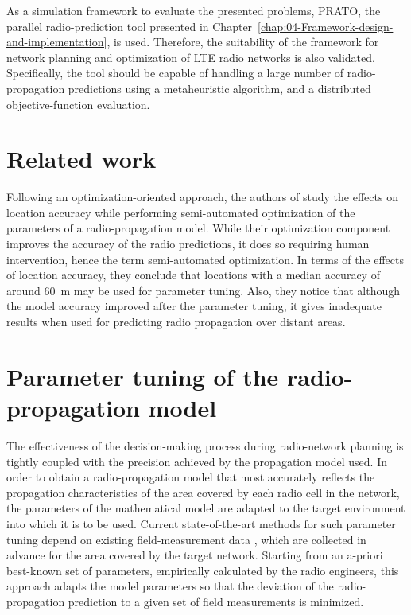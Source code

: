 As a simulation framework to evaluate the presented problems, PRATO,
the parallel radio-prediction tool presented in Chapter~\ref{chap:04-Framework-design-and-implementation},
is used. Therefore, the suitability of the framework for network planning
and optimization of LTE radio networks is also validated. Specifically,
the tool should be capable of handling a large number of radio-propagation
predictions using a metaheuristic algorithm, and a distributed objective-function
evaluation.


\section{Related work \label{sec:05-Related_work}}

Following an optimization-oriented approach, the authors of \cite{Aarnaes-Tuning_of_empirical_radio_propagation_models_effect_of_location_accuracy:2004}
study the effects on location accuracy while performing semi-automated
optimization of the parameters of a radio-propagation model. While
their optimization component improves the accuracy of the radio predictions,
it does so requiring human intervention, hence the term semi-automated
optimization. In terms of the effects of location accuracy, they conclude
that locations with a median accuracy of around 60~m may be used
for parameter tuning. Also, they notice that although the model accuracy
improved after the parameter tuning, it gives inadequate results when
used for predicting radio propagation over distant areas.




\section{Parameter tuning of the radio-propagation model \label{sec:05-Parameter_tuning_radio-propagation_model}}

The effectiveness of the decision-making process during radio-network
planning is tightly coupled with the precision achieved by the propagation
model used. In order to obtain a radio-propagation model that most
accurately reflects the propagation characteristics of the area covered
by each radio cell in the network, the parameters of the mathematical
model are adapted to the target environment into which it is to be
used. Current state-of-the-art methods for such parameter tuning depend
on existing field-measurement data \cite{Aarnaes-Tuning_of_empirical_radio_propagation_models_effect_of_location_accuracy:2004,Yang_A_linear_least_square_method_of_propagation_model_tuning_for_3G_radion_network_planning:2008},
which are collected in advance for the area covered by the target
network. Starting from an a-priori best-known set of parameters, empirically
calculated by the radio engineers, this approach adapts the model
parameters so that the deviation of the radio-propagation prediction
to a given set of field measurements is minimized.

